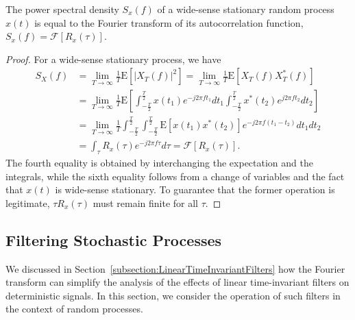 \begin{theorem}
The power spectral density $S_x (f)$ of a wide-sense stationary random process $x(t)$ is equal to the Fourier transform of its autocorrelation function, $S_x (f) = \mathcal{F} [R_x (\tau)]$.
\end{theorem}
\begin{proof}
For a wide-sense stationary process, we have
\begin{equation*}
\begin{split}
S_X(f) &= \lim_{T \rightarrow \infty} \frac{1}{T} \mathrm{E} \left[ |X_T(f)|^2 \right]
= \lim_{T \rightarrow \infty} \frac{1}{T} \mathrm{E} \left[ X_T(f) X_T^*(f) \right] \\
&= \lim_{T \rightarrow \infty} \frac{1}{T} \mathrm{E} \left[
\int_{-\frac{T}{2}}^{\frac{T}{2}} x(t_1) e^{-j2 \pi f t_1} dt_1
\int_{-\frac{T}{2}}^{\frac{T}{2}} x^*(t_2) e^{j2 \pi f t_2} dt_2 \right] \\
&= \lim_{T \rightarrow \infty} \frac{1}{T}
\int_{-\frac{T}{2}}^{\frac{T}{2}} \int_{-\frac{T}{2}}^{\frac{T}{2}}
\mathrm{E} \left[ x(t_1) x^*(t_2) \right]
e^{-j2 \pi f (t_1-t_2)} dt_1 dt_2 \\
&= \int_{\tau} R_x (\tau) e^{-j2 \pi f\tau} d\tau
= \mathcal{F} [ R_x (\tau) ] .
\end{split}
\end{equation*}
The fourth equality is obtained by interchanging the expectation and the integrals, while the sixth equality follows from a change of variables and the fact that $x(t)$ is wide-sense stationary.
To guarantee that the former operation is legitimate, $\tau R_x(\tau)$ must remain finite for all $\tau$.
\end{proof}


\subsection{Filtering Stochastic Processes}

We discussed in Section~\ref{subsection:LinearTimeInvariantFilters} how the Fourier transform can simplify the analysis of the effects of linear time-invariant filters on deterministic signals.
In this section, we consider the operation of such filters in the context of random processes.

